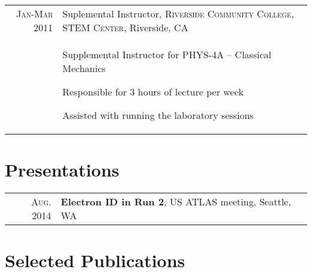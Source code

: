 \documentclass[a4paper,10pt]{article} %
\begin{document}
\begin{tabular}{r|p{11cm}}

\textsc{Jan-Mar 2011} & Suplemental Instructor, \textsc{Riverside Community College, STEM Center}, Riverside, CA \emph{}\\
		& \begin{itemize}
			\footnotesize{
				\item Supplemental Instructor for PHYS-4A – Classical Mechanics 
				\item Responsible for 3 hours of lecture per week
   				\item Assisted with running the laboratory sessions
			}
          \end{itemize}
\end{tabular}


\section{Presentations}

\begin{tabular}{rl}
\textsc{Aug.} 2014  & \textbf{Electron ID in Run 2}, US ATLAS meeting, Seattle, WA \\
\end{tabular}



\section{Selected Publications}
\end{document}
